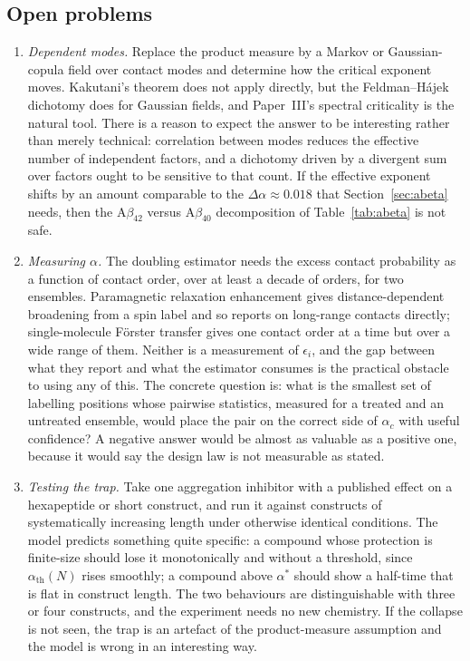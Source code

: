\documentclass[11pt,reqno]{amsart}
\theoremstyle{plain}
\theoremstyle{definition}
\theoremstyle{remark}
\numberwithin{equation}{section}
\newcommand{\Ab}{\mathrm{A}\beta}
\newcommand{\ac}{\alpha_c}
\newcommand{\ath}{\alpha_{\mathrm{th}}}
\begin{document}
\subsection{Open problems}
\begin{enumerate}[label=\textup{(\arabic*)},leftmargin=2.4em,itemsep=4pt]
\item \emph{Dependent modes.} Replace the product measure by a Markov or Gaussian-copula field over contact modes and determine how the critical exponent moves. Kakutani's theorem does not apply directly, but the Feldman--H\'aj\-ek dichotomy does for Gaussian fields, and Paper~III's spectral criticality is the natural tool. There is a reason to expect the answer to be interesting rather than merely technical: correlation between modes reduces the effective number of independent factors, and a dichotomy driven by a divergent sum over factors ought to be sensitive to that count. If the effective exponent shifts by an amount comparable to the $\Delta\alpha\approx0.018$ that Section~\ref{sec:abeta} needs, then the $\Ab_{42}$ versus $\Ab_{40}$ decomposition of Table~\ref{tab:abeta} is not safe.
\item \emph{Measuring $\alpha$.} The doubling estimator needs the excess contact probability as a function of contact order, over at least a decade of orders, for two ensembles. Paramagnetic relaxation enhancement gives distance-dependent broadening from a spin label and so reports on long-range contacts directly; single-molecule F\"orster transfer gives one contact order at a time but over a wide range of them. Neither is a measurement of $\epsilon_i$, and the gap between what they report and what the estimator consumes is the practical obstacle to using any of this. The concrete question is: what is the smallest set of labelling positions whose pairwise statistics, measured for a treated and an untreated ensemble, would place the pair on the correct side of $\ac$ with useful confidence? A negative answer would be almost as valuable as a positive one, because it would say the design law is not measurable as stated.
\item \emph{Testing the trap.} Take one aggregation inhibitor with a published effect on a hexapeptide or short construct, and run it against constructs of systematically increasing length under otherwise identical conditions. The model predicts something quite specific: a compound whose protection is finite-size should lose it monotonically and without a threshold, since $\ath(N)$ rises smoothly; a compound above $\alpha^\ast$ should show a half-time that is flat in construct length. The two behaviours are distinguishable with three or four constructs, and the experiment needs no new chemistry. If the collapse is not seen, the trap is an artefact of the product-measure assumption and the model is wrong in an interesting way.

\end{enumerate}
\end{document}
